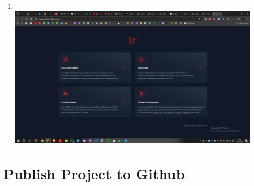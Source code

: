 \documentclass[12pt,titlepage]{article}
\begin{document}
\begin{enumerate}[label= \alph*.]
    \item - \\ \includegraphics[width=.9\textwidth]{images/figures/Laraval Init 4.png}
\end{enumerate}

\newpage

\section{Publish Project to Github}
\end{document}
